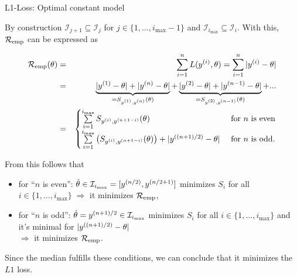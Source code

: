 \documentclass[11pt,compress,t,notes=noshow, xcolor=table]{beamer}
\begin{document}
\begin{vbframe}{L1-Loss: Optimal constant model}
\begin{itemize}
  By construction $\mathcal{I}_{j+1} \subseteq \mathcal{I}_j$ for $j \in \{1,\dots,i_{\max}-1\}$ and $\mathcal{I}_{i_{\max}} \subseteq \mathcal{I}_i$. With this, $\riske$ can be expressed as
  \begin{footnotesize}
  \begin{eqnarray*}
  \riske(\theta) &=& \sumin L(\yi,\theta) = \sumin|\yi - \theta| \\ 
  &=& \underbrace{|\yi[1] - \theta| + |\yi[n] - \theta|}_{= S_{\yi[1], \yi[n]}(\theta)} + \underbrace{|\yi[2] - \theta| + |\yi[n - 1] - \theta|}_{= S_{\yi[2], \yi[n - 1]}(\theta)} + ...  \\
  &=& \begin{cases} \sum\limits_{i = 1}^{i_{\max}} S_{\yi, \yi[n + 1 - i]}(\theta) & \text{ for } n \text{ is even} \\
  \sum\limits_{i = 1}^{i_{\max}} \left(S_{\yi, \yi[n + 1 - i]}(\theta)\right) + |\yi[(n + 1)/2] - \theta| & \text{ for } n \text{ is odd}. \end{cases}
  \end{eqnarray*}
  \end{footnotesize}

  \framebreak 


  From this follows that
  \vspace{0.35cm}
  \begin{itemize}
  \setlength{\itemsep}{1.4em}
  \item for \enquote{$n$ is even}: $\thetah \in  \mathcal{I}_{i_{\max}} = [y^{(n/2)},y^{(n/2+1)}]$ minimizes $S_i$ for all $i \in \{1,\dots, i_{\max}\} \; \Rightarrow$  it minimizes $\riske$,
  \item for \enquote{$n$ is odd}: $\thetah = y^{(n+1)/2} \in \mathcal{I}_{i_{\max}}$ minimizes $S_i$ for all $i \in \{1,\dots, i_{\max}\}$ and it's minimal for
  $|\yi[(n + 1)/2] - \theta|$ \\ $\Rightarrow$
  it minimizes $\riske$.
  \end{itemize}
  \vspace{0.35cm}  
  Since the median fulfills these conditions, we can conclude that it minimizes 
  the $L1$ loss.
\end{itemize}


\end{vbframe}
\end{document}
